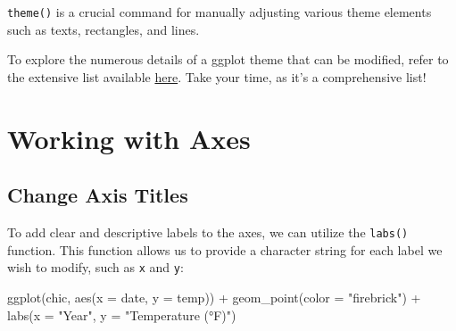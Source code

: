 \documentclass[
  letterpaper,
]{scrbook}
\newenvironment{Shaded}{\begin{snugshade}}{\end{snugshade}}
\newcommand{\AttributeTok}[1]{\textcolor[rgb]{0.40,0.45,0.13}{#1}}
\newcommand{\FunctionTok}[1]{\textcolor[rgb]{0.28,0.35,0.67}{#1}}
\newcommand{\NormalTok}[1]{\textcolor[rgb]{0.00,0.23,0.31}{#1}}
\newcommand{\SpecialCharTok}[1]{\textcolor[rgb]{0.37,0.37,0.37}{#1}}
\newcommand{\StringTok}[1]{\textcolor[rgb]{0.13,0.47,0.30}{#1}}
\begin{document}
\begin{tcolorbox}[enhanced jigsaw, rightrule=.15mm, arc=.35mm, title=\textcolor{quarto-callout-important-color}{\faExclamation}\hspace{0.5em}{Remember!}, colback=white, toptitle=1mm, colbacktitle=quarto-callout-important-color!10!white, breakable, left=2mm, opacityback=0, leftrule=.75mm, bottomrule=.15mm, bottomtitle=1mm, colframe=quarto-callout-important-color-frame, coltitle=black, toprule=.15mm, opacitybacktitle=0.6, titlerule=0mm]

\texttt{theme()} is a crucial command for manually adjusting various
theme elements such as texts, rectangles, and lines.

\end{tcolorbox}

To explore the numerous details of a ggplot theme that can be modified,
refer to the extensive list available
\href{https://ggplot2.tidyverse.org/reference/theme.html}{here}. Take
your time, as it's a comprehensive list!


\chapter{Working with Axes}\label{axes}

\section{Change Axis Titles}\label{change-axis-titles}

To add clear and descriptive labels to the axes, we can utilize the
\texttt{labs()} function. This function allows us to provide a character
string for each label we wish to modify, such as \texttt{x} and
\texttt{y}:

\begin{Shaded}
\begin{Highlighting}[]
\FunctionTok{ggplot}\NormalTok{(chic, }\FunctionTok{aes}\NormalTok{(}\AttributeTok{x =}\NormalTok{ date, }\AttributeTok{y =}\NormalTok{ temp)) }\SpecialCharTok{+}
  \FunctionTok{geom\_point}\NormalTok{(}\AttributeTok{color =} \StringTok{"firebrick"}\NormalTok{) }\SpecialCharTok{+}
  \FunctionTok{labs}\NormalTok{(}\AttributeTok{x =} \StringTok{"Year"}\NormalTok{, }\AttributeTok{y =} \StringTok{"Temperature (°F)"}\NormalTok{)}
\end{Highlighting}
\end{Shaded}
\end{document}
